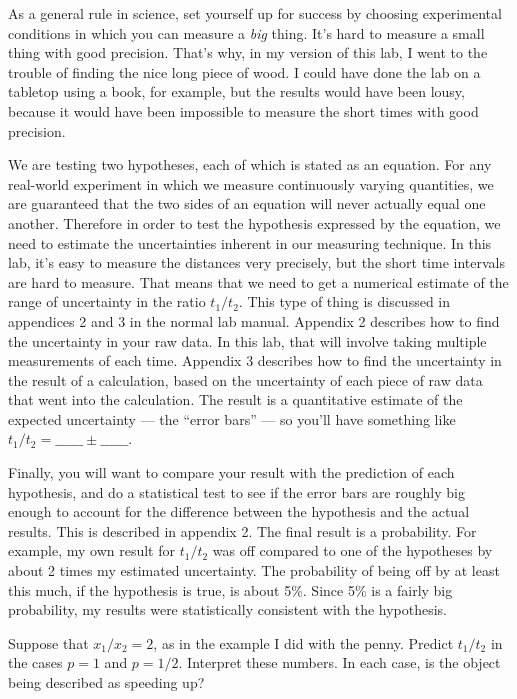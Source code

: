 As a general rule in science, set yourself up for success by choosing experimental conditions
in which you can measure a \emph{big} thing. It's hard to measure a small thing with good
precision. That's why, in my version of this lab, I went to the trouble of finding the nice
long piece of wood. I could have done the lab on a tabletop using a book, for example, but
the results would have been lousy, because it would have been impossible to measure the
short times with good precision.

\analysis

We are testing two hypotheses, each of which is stated as an equation. For any real-world
experiment in which we measure continuously varying quantities, we are guaranteed that the two sides of an equation will
never actually equal one another. Therefore in order to test the hypothesis expressed by the
equation, we need to estimate the uncertainties inherent in our measuring technique. In this
lab, it's easy to measure the distances very precisely, but the short time intervals are
hard to measure. That means that we need to get a numerical estimate of the range of uncertainty
in the ratio $t_1/t_2$. This type of thing is discussed in appendices 2 and 3 in the
normal lab manual. Appendix 2 describes how to find the uncertainty in your raw data. In this
lab, that will involve taking multiple measurements of each time. Appendix 3 describes how
to find the uncertainty in the result of a calculation, based on the uncertainty of each piece
of raw data that went into the calculation. The result is a quantitative estimate of the expected
uncertainty --- the ``error bars'' --- so you'll have something like $t_1/t_2=\_\_\_\_\_\_ \pm \_\_\_\_\_\_$.

Finally,
you will want to compare your result with the prediction of each hypothesis, and do a statistical test to see if the
error bars are roughly big enough to account for the difference between the hypothesis and the actual results. This
is described in appendix 2.
The final result is a probability. For example, my own result for $t_1/t_2$ was off compared to one of
the hypotheses by about 2 times my estimated uncertainty. The probability of being off by at least this much, if the
hypothesis is true, is about 5\%. Since 5\% is a fairly big probability, my results were statistically consistent
with the hypothesis.


\prelab

\prelabquestion  
Suppose that $x_1/x_2=2$, as in the example I did with the penny. Predict $t_1/t_2$ in
the cases $p=1$ and $p=1/2$. Interpret these numbers. In each case, is the object
being described as speeding up?



